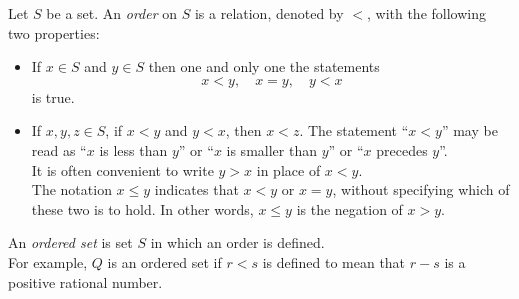 \begin{definition}
    Let $\mathit{S}$ be a set. An \textit{order} on $\mathit{S}$ is a relation, denoted by $<$, with 
    the following two properties:
    \begin{itemize}
        \item If $x \in \mathit{S}$ and $y \in \mathit{S}$ then one and only one the statements
    \begin{equation*}
        x<y,\quad x=y,\quad y<x
    \end{equation*}
    is true.
    \item If $x,y,z \in \mathit{S}$, if $x<y$ and $y<x$, then $x<z$.
    The statement ``$x<y$'' may be read as ``$x$ is less than $y$'' or ``$x$ is smaller than $y$'' 
    or ``$x$ precedes $y$''.\\
    It is often convenient to write $y>x$ in place of $x<y$.\\
    The notation $x \leq y$ indicates that $x<y$ or $x=y$, without specifying which of these two is to hold. 
    In other words, $x \leq y$ is the negation of $x>y$.
    \end{itemize}
\end{definition}

\begin{definition}
    An \textit{ordered set} is set $\mathit{S}$ in which an order is defined.\\
    For example, $\mathit{Q}$ is an ordered set if $r<s$ is defined to mean that $r-s$ is a positive rational number.
\end{definition}




